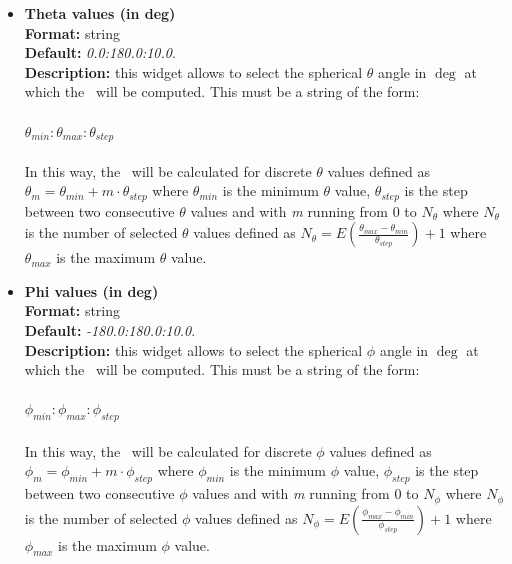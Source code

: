 \documentclass[a4paper,11pt]{report}
\newcommand{\nm}{\textit{nm}}
\begin{document}
\begin{itemize}
For example,
\begin{itemize}
\item \textit{0:10:1} will compute \PDF\ for \textit{r = 0, 1, 2, 3, 4, 5, 6, 7, 8, 9, 10} \nm .
\item \textit{3:7:1.2} will compute \PDF\ for \textit{r = 3, 4.2, 5.4, 6.6} \nm .
\end{itemize}
\newpage
\hypertarget{sd_theta_values}{}
\item \textbf{Theta values (in deg)}\\
\textbf{Format:} string\\
\textbf{Default:} \textit{0.0:180.0:10.0}.\\
\textbf{Description:} this widget allows to select the spherical $\theta$ angle in $\deg$ at which the \SD\ will be computed. 
This must be a string of the form:
\\\\
$\theta_{min}:\theta_{max}:\theta_{step}$
\\\\
In this way, the \SD\ will be calculated for discrete $\theta$ values defined as 
$\theta_m = \theta_{min} + m \cdot \theta_{step}$ where $\theta_{min}$ is the minimum $\theta$ value, $\theta_{step}$ is 
the step between two consecutive $\theta$ values and with \textit{m} running from 0 to $N_{\theta}$ 
where $N_{\theta}$ is the number of selected $\theta$ values defined as 
$N_{\theta}= E(\frac{\theta_{max} - \theta_{min}}{\theta_{step}}) + 1$ where $\theta_{max}$ is the 
maximum $\theta$ value.

\hypertarget{sd_phi_values}{}
\item \textbf{Phi values (in deg)}\\
\textbf{Format:} string\\
\textbf{Default:} \textit{-180.0:180.0:10.0}.\\
\textbf{Description:} this widget allows to select the spherical $\phi$ angle in $\deg$ at which the \SD\ will be computed. 
This must be a string of the form:
\\\\
$\phi_{min}:\phi_{max}:\phi_{step}$
\\\\
In this way, the \SD\ will be calculated for discrete $\phi$ values defined as 
$\phi_m = \phi_{min} + m \cdot \phi_{step}$ where $\phi_{min}$ is the minimum $\phi$ value, $\phi_{step}$ is 
the step between two consecutive $\phi$ values and with \textit{m} running from 0 to $N_{\phi}$ 
where $N_{\phi}$ is the number of selected $\phi$ values defined as 
$N_{\phi}= E(\frac{\phi_{max} - \phi_{min}}{\phi_{step}}) + 1$ where $\phi_{max}$ is the 
maximum $\phi$ value.


\end{itemize}
\end{document}
